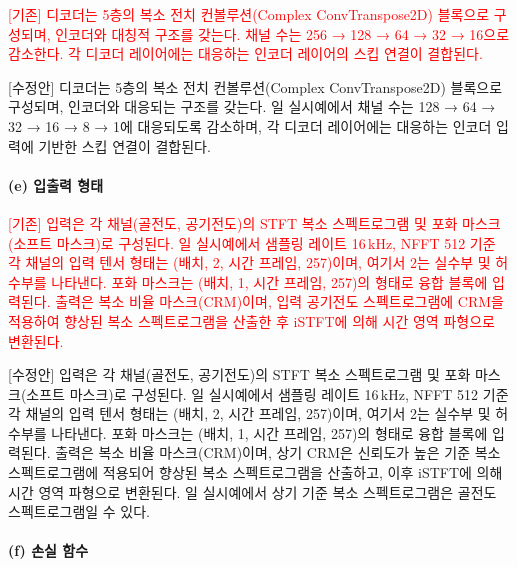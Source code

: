 \documentclass{article}
\newcommand{\reviewold}[1]{{\par\noindent\textcolor{red}{[기존] #1}}}
\newcommand{\reviewnew}[1]{{\par\noindent\textcolor{customblue}{[수정안] #1}}}
\newcommand{\reviewpair}[2]{\reviewold{#1}\reviewnew{#2}\par}
\begin{document}
\reviewpair{디코더는 5층의 복소 전치 컨볼루션(Complex ConvTranspose2D) 블록으로 구성되며, 인코더와 대칭적 구조를 갖는다. 채널 수는 256 → 128 → 64 → 32 → 16으로 감소한다. 각 디코더 레이어에는 대응하는 인코더 레이어의 스킵 연결이 결합된다.}{디코더는 5층의 복소 전치 컨볼루션(Complex ConvTranspose2D) 블록으로 구성되며, 인코더와 대응되는 구조를 갖는다. 일 실시예에서 채널 수는 128 → 64 → 32 → 16 → 8 → 1에 대응되도록 감소하며, 각 디코더 레이어에는 대응하는 인코더 입력에 기반한 스킵 연결이 결합된다.}

\paragraph{(e) 입출력 형태}

\reviewpair{입력은 각 채널(골전도, 공기전도)의 STFT 복소 스펙트로그램 및 포화 마스크(소프트 마스크)로 구성된다. 일 실시예에서 샘플링 레이트 16\,kHz, NFFT 512 기준 각 채널의 입력 텐서 형태는 (배치, 2, 시간 프레임, 257)이며, 여기서 2는 실수부 및 허수부를 나타낸다. 포화 마스크는 (배치, 1, 시간 프레임, 257)의 형태로 융합 블록에 입력된다. 출력은 복소 비율 마스크(CRM)이며, 입력 공기전도 스펙트로그램에 CRM을 적용하여 향상된 복소 스펙트로그램을 산출한 후 iSTFT에 의해 시간 영역 파형으로 변환된다.}{입력은 각 채널(골전도, 공기전도)의 STFT 복소 스펙트로그램 및 포화 마스크(소프트 마스크)로 구성된다. 일 실시예에서 샘플링 레이트 16\,kHz, NFFT 512 기준 각 채널의 입력 텐서 형태는 (배치, 2, 시간 프레임, 257)이며, 여기서 2는 실수부 및 허수부를 나타낸다. 포화 마스크는 (배치, 1, 시간 프레임, 257)의 형태로 융합 블록에 입력된다. 출력은 복소 비율 마스크(CRM)이며, 상기 CRM은 신뢰도가 높은 기준 복소 스펙트로그램에 적용되어 향상된 복소 스펙트로그램을 산출하고, 이후 iSTFT에 의해 시간 영역 파형으로 변환된다. 일 실시예에서 상기 기준 복소 스펙트로그램은 골전도 스펙트로그램일 수 있다.}

\paragraph{(f) 손실 함수}
\end{document}
